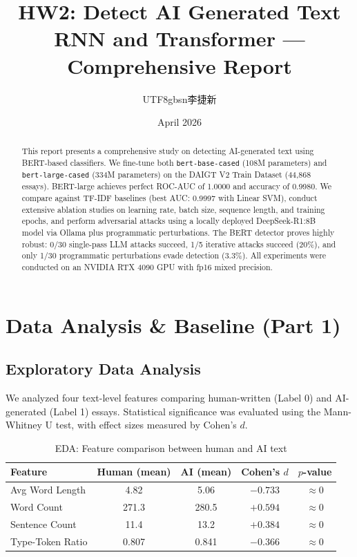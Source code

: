 \documentclass[11pt,a4paper]{article}
\title{\textbf{HW2: Detect AI Generated Text}\\[0.3em]
\large RNN and Transformer — Comprehensive Report}
\author{\begin{CJK*}{UTF8}{gbsn}李捷新\end{CJK*}}
\date{April 2026}
\begin{document}
\maketitle

\begin{abstract}
This report presents a comprehensive study on detecting AI-generated text using BERT-based classifiers. We fine-tune both \texttt{bert-base-cased} (108M parameters) and \texttt{bert-large-cased} (334M parameters) on the DAIGT V2 Train Dataset (44,868 essays). BERT-large achieves perfect ROC-AUC of 1.0000 and accuracy of 0.9980. We compare against TF-IDF baselines (best AUC: 0.9997 with Linear SVM), conduct extensive ablation studies on learning rate, batch size, sequence length, and training epochs, and perform adversarial attacks using a locally deployed DeepSeek-R1:8B model via Ollama plus programmatic perturbations. The BERT detector proves highly robust: 0/30 single-pass LLM attacks succeed, 1/5 iterative attacks succeed (20\%), and only 1/30 programmatic perturbations evade detection (3.3\%). All experiments were conducted on an NVIDIA RTX 4090 GPU with fp16 mixed precision.
\end{abstract}

\tableofcontents
\newpage

\section{Data Analysis \& Baseline (Part 1)}

\subsection{Exploratory Data Analysis}

We analyzed four text-level features comparing human-written (Label 0) and AI-generated (Label 1) essays. Statistical significance was evaluated using the Mann-Whitney U test, with effect sizes measured by Cohen's $d$.

\begin{table}[H]
\centering
\caption{EDA: Feature comparison between human and AI text}
\label{tab:eda}
\begin{tabular}{lcccc}
\toprule
\textbf{Feature} & \textbf{Human (mean)} & \textbf{AI (mean)} & \textbf{Cohen's $d$} & \textbf{$p$-value} \\
\midrule
Avg Word Length     & 4.82  & 5.06  & $-0.733$ & $\approx 0$ \\
Word Count          & 271.3 & 280.5 & $+0.594$ & $\approx 0$ \\
Sentence Count      & 11.4  & 13.2  & $+0.384$ & $\approx 0$ \\
Type-Token Ratio    & 0.807 & 0.841 & $-0.366$ & $\approx 0$ \\
\bottomrule
\end{tabular}
\end{table}
\end{document}
